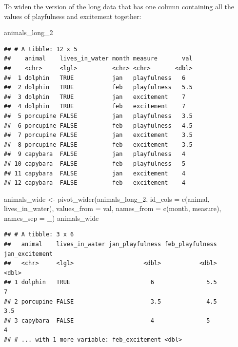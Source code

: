 \documentclass[
]{book}
\newenvironment{Shaded}{\begin{snugshade}}{\end{snugshade}}
\newcommand{\AttributeTok}[1]{\textcolor[rgb]{0.77,0.63,0.00}{#1}}
\newcommand{\FunctionTok}[1]{\textcolor[rgb]{0.00,0.00,0.00}{#1}}
\newcommand{\NormalTok}[1]{#1}
\newcommand{\OtherTok}[1]{\textcolor[rgb]{0.56,0.35,0.01}{#1}}
\newcommand{\StringTok}[1]{\textcolor[rgb]{0.31,0.60,0.02}{#1}}
\begin{document}
To widen the version of the long data that has one column containing all the values of playfulness and excitement together:

\begin{Shaded}
\begin{Highlighting}[]
\NormalTok{animals\_long\_2}
\end{Highlighting}
\end{Shaded}

\begin{verbatim}
## # A tibble: 12 x 5
##    animal    lives_in_water month measure       val
##    <chr>     <lgl>          <chr> <chr>       <dbl>
##  1 dolphin   TRUE           jan   playfulness   6  
##  2 dolphin   TRUE           feb   playfulness   5.5
##  3 dolphin   TRUE           jan   excitement    7  
##  4 dolphin   TRUE           feb   excitement    7  
##  5 porcupine FALSE          jan   playfulness   3.5
##  6 porcupine FALSE          feb   playfulness   4.5
##  7 porcupine FALSE          jan   excitement    3.5
##  8 porcupine FALSE          feb   excitement    3.5
##  9 capybara  FALSE          jan   playfulness   4  
## 10 capybara  FALSE          feb   playfulness   5  
## 11 capybara  FALSE          jan   excitement    4  
## 12 capybara  FALSE          feb   excitement    4
\end{verbatim}

\begin{Shaded}
\begin{Highlighting}[]
\NormalTok{animals\_wide }\OtherTok{\textless{}{-}} \FunctionTok{pivot\_wider}\NormalTok{(animals\_long\_2,}
                            \AttributeTok{id\_cols =} \FunctionTok{c}\NormalTok{(}\StringTok{\textquotesingle{}animal\textquotesingle{}}\NormalTok{, }\StringTok{\textquotesingle{}lives\_in\_water\textquotesingle{}}\NormalTok{),}
                            \AttributeTok{values\_from =} \StringTok{\textquotesingle{}val\textquotesingle{}}\NormalTok{,}
                            \AttributeTok{names\_from =} \FunctionTok{c}\NormalTok{(}\StringTok{\textquotesingle{}month\textquotesingle{}}\NormalTok{, }\StringTok{\textquotesingle{}measure\textquotesingle{}}\NormalTok{),}
                            \AttributeTok{names\_sep =} \StringTok{\textquotesingle{}\_\textquotesingle{}}\NormalTok{)}
\NormalTok{animals\_wide}
\end{Highlighting}
\end{Shaded}

\begin{verbatim}
## # A tibble: 3 x 6
##   animal    lives_in_water jan_playfulness feb_playfulness jan_excitement
##   <chr>     <lgl>                    <dbl>           <dbl>          <dbl>
## 1 dolphin   TRUE                       6               5.5            7  
## 2 porcupine FALSE                      3.5             4.5            3.5
## 3 capybara  FALSE                      4               5              4  
## # ... with 1 more variable: feb_excitement <dbl>
\end{verbatim}
\end{document}

